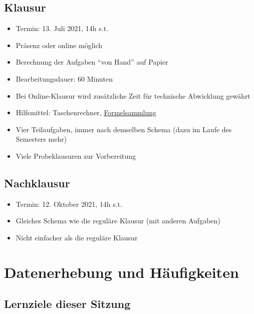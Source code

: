 \documentclass[
  11pt,
  ngerman,
  a4paper,
]{report}
\providecommand{\tightlist}{%
  \setlength{\itemsep}{0pt}\setlength{\parskip}{0pt}}
\begin{document}
\hypertarget{klausur}{%
\section*{Klausur}\label{klausur}}

\begin{itemize}
\tightlist
\item
  Termin: 13. Juli 2021, 14h s.t.
\item
  Präsenz oder online möglich
\item
  Berechnung der Aufgaben \enquote{von Hand} auf Papier
\item
  Bearbeitungsdauer: 60 Minuten
\item
  Bei Online-Klausur wird zusätzliche Zeit für technische Abwicklung gewährt
\item
  Hilfsmittel: Taschenrechner, \protect\hyperlink{formelsammlung-und-wertetabellen}{Formelsammlung}
\item
  Vier Teilaufgaben, immer nach demselben Schema (dazu im Laufe des Semesters mehr)
\item
  Viele Probeklausuren zur Vorbereitung
\end{itemize}

\hypertarget{nachklausur}{%
\section*{Nachklausur}\label{nachklausur}}

\begin{itemize}
\tightlist
\item
  Termin: 12. Oktober 2021, 14h s.t.
\item
  Gleiches Schema wie die reguläre Klausur (mit anderen Aufgaben)
\item
  Nicht einfacher als die reguläre Klausur
\end{itemize}

\hypertarget{datenerhebung-und-huxe4ufigkeiten}{%
\chapter{Datenerhebung und Häufigkeiten}\label{datenerhebung-und-huxe4ufigkeiten}}

\hypertarget{lernziele-dieser-sitzung}{%
\section*{Lernziele dieser Sitzung}\label{lernziele-dieser-sitzung}}
\end{document}
